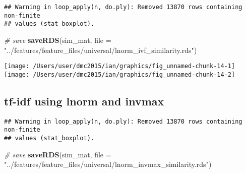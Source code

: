 \documentclass[10pt]{report}
\newenvironment{Shaded}{}{}
\newcommand{\KeywordTok}[1]{\textcolor[rgb]{0.00,0.44,0.13}{\textbf{{#1}}}}
\newcommand{\DataTypeTok}[1]{\textcolor[rgb]{0.56,0.13,0.00}{{#1}}}
\newcommand{\StringTok}[1]{\textcolor[rgb]{0.25,0.44,0.63}{{#1}}}
\newcommand{\CommentTok}[1]{\textcolor[rgb]{0.38,0.63,0.69}{\textit{{#1}}}}
\newcommand{\NormalTok}[1]{{#1}}
\begin{document}
\begin{verbatim}
## Warning in loop_apply(n, do.ply): Removed 13870 rows containing non-finite
## values (stat_boxplot).
\end{verbatim}

\begin{Shaded}
\begin{Highlighting}[]
\CommentTok{# save}
\KeywordTok{saveRDS}\NormalTok{(sim_mat, }\DataTypeTok{file =} \StringTok{"../features/feature_files/universal/lnorm_ivf_similarity.rds"}\NormalTok{)}
\end{Highlighting}
\end{Shaded}

\begin{center}\texttt{[image: /Users/user/dmc2015/ian/graphics/fig\_unnamed-chunk-14-1]} \texttt{[image: /Users/user/dmc2015/ian/graphics/fig\_unnamed-chunk-14-2]} \end{center}

\subsection{tf-idf using lnorm and
invmax}\label{tf-idf-using-lnorm-and-invmax}

\begin{Shaded}
\end{Shaded}

\begin{verbatim}
## Warning in loop_apply(n, do.ply): Removed 13870 rows containing non-finite
## values (stat_boxplot).
\end{verbatim}

\begin{Shaded}
\begin{Highlighting}[]
\CommentTok{# save}
\KeywordTok{saveRDS}\NormalTok{(sim_mat, }\DataTypeTok{file =} \StringTok{"../features/feature_files/universal/lnorm_invmax_similarity.rds"}\NormalTok{)}
\end{Highlighting}
\end{Shaded}
\end{document}
